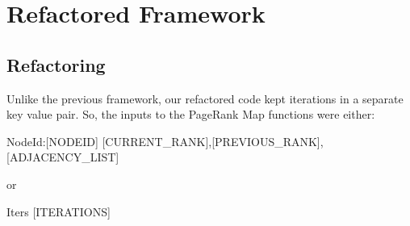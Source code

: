 \section{Refactored Framework}
\subsection*{Refactoring}
Unlike the previous framework, our refactored code kept iterations in a separate key value pair.  So, the inputs to the PageRank Map functions were either:
\begin{center}
  NodeId:[NODEID] \hspace{8mm} [CURRENT\_RANK],[PREVIOUS\_RANK],[ADJACENCY\_LIST]
\end{center}
or
\begin{center}
  Iters \hspace{8mm} [ITERATIONS]
\end{center}

